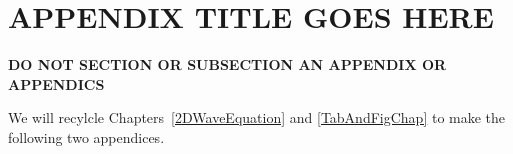 \chapter{APPENDIX TITLE GOES HERE} \label{ap:a}


{\bf DO NOT SECTION OR SUBSECTION AN APPENDIX OR APPENDICS}

We will recylcle Chapters~\ref{2DWaveEquation} and \ref{TabAndFigChap}
to make the following two appendices.






